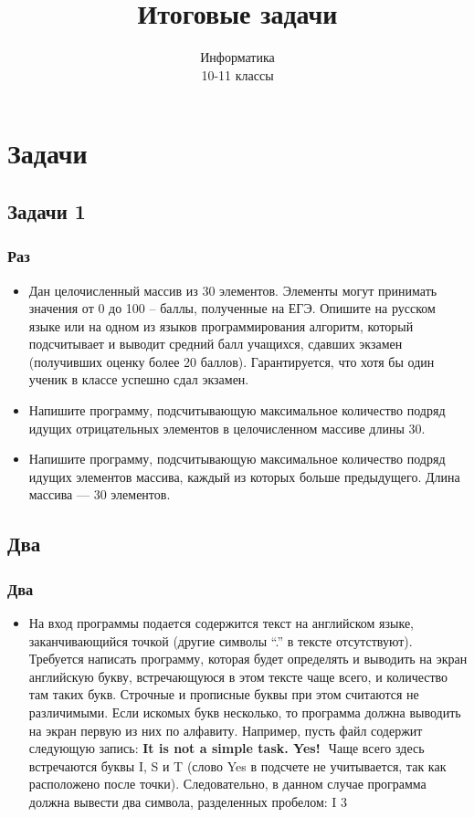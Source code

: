 \documentclass[compress,red]{beamer}
\title{Итоговые задачи}
\author{Информатика \\ 10-11 классы}
\begin{document}
\maketitle

\section{Задачи}

\subsection{Задачи 1}
\begin{frame}[fragile]
  \frametitle{Раз}
  \begin{itemize}
    \item Дан целочисленный массив из 30 элементов. Элементы могут принимать значения от 0 до 100 – баллы, полученные на ЕГЭ. Опишите на русском языке или на одном из языков программирования алгоритм, который подсчитывает и выводит средний балл учащихся, сдавших экзамен (получивших оценку более 20 баллов). Гарантируется, что хотя бы один ученик в классе успешно сдал экзамен.
    \item Напишите программу, подсчитывающую максимальное количество подряд идущих отрицательных элементов в целочисленном массиве длины 30.
    \item Напишите программу, подсчитывающую максимальное количество подряд идущих элементов массива, каждый из которых больше предыдущего. Длина массива — 30 элементов.
  \end{itemize}
\end{frame}

\subsection{Два}
\begin{frame}[fragile]
  \frametitle{Два}
  \begin{itemize}
    \item На вход программы подается содержится текст на английском языке, заканчивающийся точкой (другие символы “.” в тексте отсутствуют). Требуется написать программу, которая будет определять и выводить на экран английскую букву, встречающуюся в этом тексте чаще всего, и количество там таких букв. Строчные и прописные буквы при этом считаются не различимыми. Если искомых букв несколько, то программа должна выводить на экран первую из них по алфавиту. Например, пусть файл содержит следующую запись: \textbf{It is not a simple task. Yes!}  Чаще всего здесь встречаются буквы I, S и T (слово Yes в подсчете не учитывается, так как расположено после точки). Следовательно, в данном случае программа должна вывести два символа, разделенных пробелом: I 3
  \end{itemize}
\end{frame}
\end{document}
